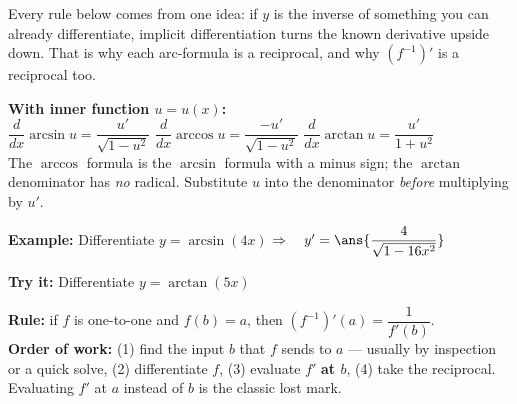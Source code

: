 \documentclass[12pt]{article}
\begin{document}

\noindent\small Every rule below comes from one idea: if $y$ is the inverse of something you can
already differentiate, implicit differentiation turns the known derivative upside down. That is why
each arc-formula is a reciprocal, and why $(f^{-1})'$ is a reciprocal too.\normalsize


\begin{formulabox}
\textbf{With inner function $u = u(x)$:}\\[4pt]
$\dfrac{d}{dx}\arcsin u = \dfrac{u'}{\sqrt{1 - u^{2}}}$ \qquad
$\dfrac{d}{dx}\arccos u = \dfrac{-u'}{\sqrt{1 - u^{2}}}$ \qquad
$\dfrac{d}{dx}\arctan u = \dfrac{u'}{1 + u^{2}}$\\[4pt]
The $\arccos$ formula is the $\arcsin$ formula with a minus sign; the $\arctan$ denominator has
\emph{no} radical. Substitute $u$ into the denominator \emph{before} multiplying by $u'$.
\end{formulabox}

\begin{examplebox}
\textbf{Example:} \quad Differentiate $y = \arcsin(4x)$
$\Rightarrow\quad y' = \ans{\dfrac{4}{\sqrt{1 - 16x^{2}}}}$
\end{examplebox}

\begin{tryitbox}
\textbf{Try it:} \quad Differentiate $y = \arctan(5x)$\\[2pt]
\end{tryitbox}


\begin{formulabox}
\textbf{Rule:} if $f$ is one-to-one and $f(b) = a$, then
$\left(f^{-1}\right)'(a) = \dfrac{1}{f'(b)}$.\\[3pt]
\textbf{Order of work:} (1) find the input $b$ that $f$ sends to $a$ --- usually by inspection or a
quick solve, (2) differentiate $f$, (3) evaluate $f'$ \textbf{at $b$}, (4) take the reciprocal.
Evaluating $f'$ at $a$ instead of $b$ is the classic lost mark.
\end{formulabox}
\end{document}

